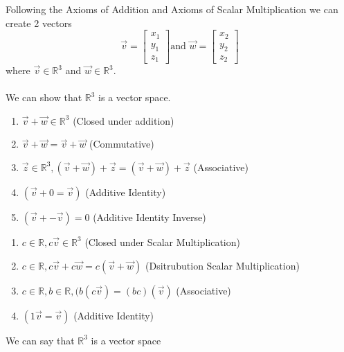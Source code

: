 \documentclass[12pt]{article}
\begin{document}
  Following the Axioms of Addition and Axioms of Scalar Multiplication we can create 2 vectors
  \begin{equation*}
    \vec{v} = \begin{bmatrix}x_1 \\ y_1 \\ z_1\end{bmatrix} \text{and } \vec{w} = \begin{bmatrix}x_2 \\ y_2 \\ z_2 \end{bmatrix}
  \end{equation*}
  where $\vec{v} \in \mathbb{R}^3$ and $\vec{w}\in \mathbb{R}^3$.
  \\\\We can show that $\mathbb{R}^3$ is a vector space.
  \\ \begin{enumerate}
    \item $\vec{v}+ \vec{w} \in \mathbb{R}^3$ (Closed under addition) \checkmark
    \item $\vec{v}+ \vec{w} = \vec{v}+ \vec{w}$ (Commutative) \checkmark
    \item $\vec{z} \in \mathbb{R}^3, (\vec{v}+ \vec{w}) + \vec{z} = (\vec{v}+ \vec{w}) + \vec{z}$ (Associative) \checkmark
    \item $(\vec{v} + 0 = \vec{v})$ (Additive Identity) \checkmark
    \item $(\vec{v} + -\vec{v})= 0$ (Additive Identity Inverse) \checkmark
    \end{enumerate}
  \begin{enumerate}
    \item $c \in \mathbb{R},c\vec{v} \in \mathbb{R}^3$ (Closed under Scalar Multiplication) \checkmark
    \item $c \in \mathbb{R},c\vec{v}+ c\vec{w} = c(\vec{v}+ \vec{w})$ (Dsitrubution Scalar Multiplication) \checkmark
    \item $c \in \mathbb{R},b \in \mathbb{R},(b(c\vec{v}) = (bc)(\vec{v})$ (Associative) \checkmark
    \item $(1\vec{v} = \vec{v})$ (Additive Identity)\checkmark
    \end{enumerate}
    We can say that $\mathbb{R}^3$ is a vector space \\\\
\end{document}

